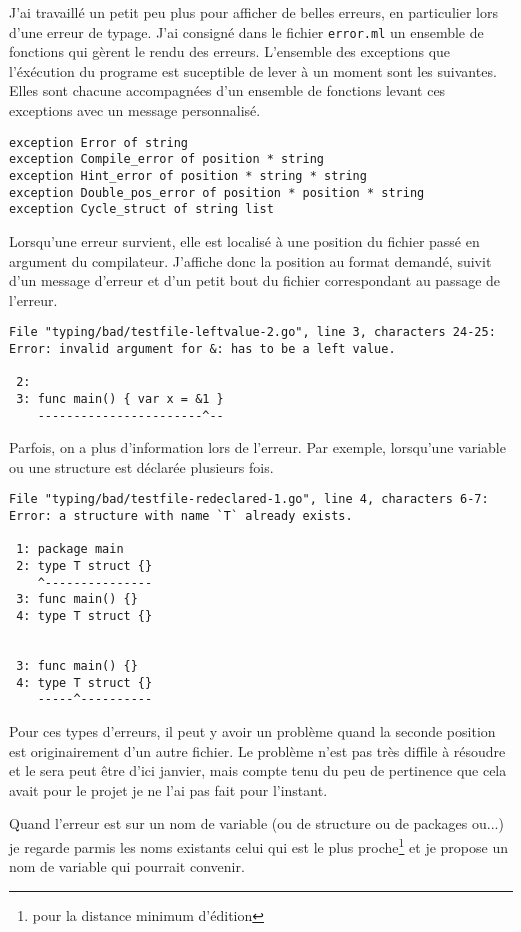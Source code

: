 \documentclass{article}
\begin{document}
J'ai travaillé un petit peu plus pour afficher de belles erreurs, en particulier lors d'une erreur de typage. J'ai consigné dans le fichier \texttt{error.ml} un ensemble de fonctions qui gèrent le rendu des erreurs. L'ensemble des exceptions que l'éxécution du programe est suceptible de lever à un moment sont les suivantes. Elles sont chacune accompagnées d'un ensemble de fonctions levant ces exceptions avec un message personnalisé.

\begin{verbatim}
exception Error of string
exception Compile_error of position * string
exception Hint_error of position * string * string
exception Double_pos_error of position * position * string
exception Cycle_struct of string list
\end{verbatim}

Lorsqu'une erreur survient, elle est localisé à une position du fichier passé en argument du compilateur. J'affiche donc la position au format demandé, suivit d'un message d'erreur et d'un petit bout du fichier correspondant au passage de l'erreur.

\begin{verbatim}
File "typing/bad/testfile-leftvalue-2.go", line 3, characters 24-25:
Error: invalid argument for &: has to be a left value.

 2:
 3: func main() { var x = &1 }
    -----------------------^--
\end{verbatim}

Parfois, on a plus d'information lors de l'erreur. Par exemple, lorsqu'une variable ou une structure est déclarée plusieurs fois.

\begin{verbatim}
File "typing/bad/testfile-redeclared-1.go", line 4, characters 6-7:
Error: a structure with name `T` already exists.

 1: package main
 2: type T struct {}
    ^---------------
 3: func main() {}
 4: type T struct {}


 3: func main() {}
 4: type T struct {}
    -----^----------
\end{verbatim}

Pour ces types d'erreurs, il peut y avoir un problème quand la seconde position est originairement d'un autre fichier. Le problème n'est pas très diffile à résoudre et le sera peut être d'ici janvier, mais compte tenu du peu de pertinence que cela avait pour le projet je ne l'ai pas fait pour l'instant.

Quand l'erreur est sur un nom de variable (ou de structure ou de packages ou...) je regarde parmis les noms existants celui qui est le plus proche\footnote{pour la distance minimum d'édition} et je propose un nom de variable qui pourrait convenir.
\end{document}
